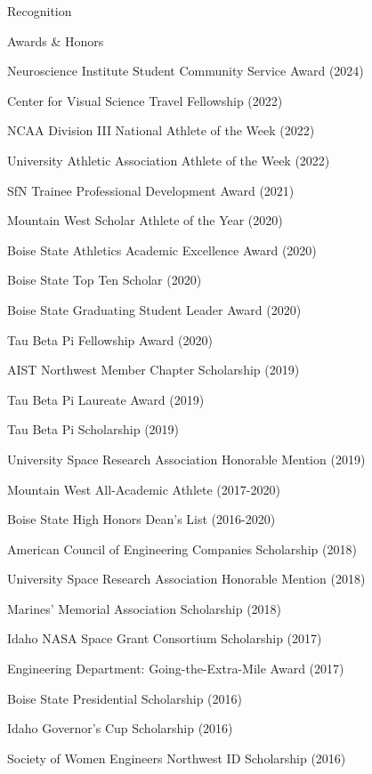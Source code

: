 \documentclass{resume} %
\begin{document}
\begin{rSection}{Recognition}
\begin{rSubsection2}{Awards \& Honors}{}{}{}
\item Neuroscience Institute Student Community Service Award (2024)
\item Center for Visual Science Travel Fellowship (2022)
\item NCAA Division III National Athlete of the Week (2022)
\item University Athletic Association Athlete of the Week (2022)
\item SfN Trainee Professional Development Award (2021)
\item Mountain West Scholar Athlete of the Year (2020)
\item Boise State Athletics Academic Excellence Award (2020) 
\item Boise State Top Ten Scholar (2020)
\item Boise State Graduating Student Leader Award (2020)
\item Tau Beta Pi Fellowship Award (2020)
\item AIST Northwest Member Chapter Scholarship (2019)
\item Tau Beta Pi Laureate Award (2019)
\item Tau Beta Pi Scholarship (2019)
\item University Space Research Association Honorable Mention (2019)
\item Mountain West All-Academic Athlete (2017-2020)
\item Boise State High Honors Dean’s List (2016-2020)
\item American Council of Engineering Companies Scholarship (2018)
\item University Space Research Association Honorable Mention (2018)
\item Marines’ Memorial Association Scholarship (2018)
\item Idaho NASA Space Grant Consortium Scholarship (2017)
\item Engineering Department: Going-the-Extra-Mile Award (2017)
\item Boise State Presidential Scholarship (2016)
\item Idaho Governor’s Cup Scholarship (2016)
\item Society of Women Engineers Northwest ID Scholarship (2016)
\end{rSubsection2}


\end{rSection}
\end{document}
